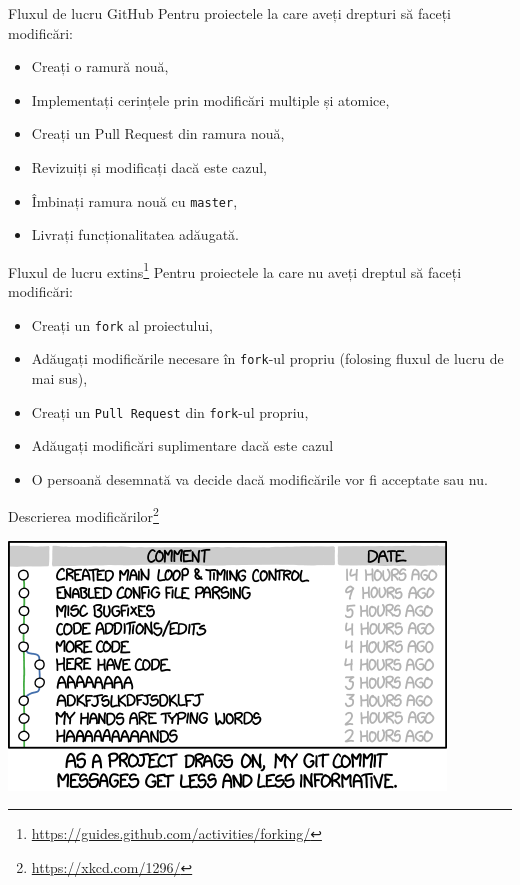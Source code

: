 \documentclass[presentation]{beamer}
\begin{document}
\begin{frame}[label={sec:orgafaea58},fragile]{Fluxul de lucru GitHub}
 Pentru proiectele la care aveți drepturi să faceți modificări:
\begin{itemize}
\item Creați o ramură nouă,
\item Implementați cerințele prin \alert{modificări multiple și atomice},
\item Creați un \alert{Pull Request} din ramura nouă,
\item Revizuiți și modificați dacă este cazul,
\item Îmbinați ramura nouă cu \texttt{master},
\item Livrați funcționalitatea adăugată.
\end{itemize}
\end{frame}
\begin{frame}[label={sec:org06f68ce},fragile]{Fluxul de lucru extins\footnote{\url{https://guides.github.com/activities/forking/}}}
 Pentru proiectele la care nu aveți dreptul să faceți modificări:
\begin{itemize}
\item Creați un \texttt{fork} al proiectului,
\item Adăugați modificările necesare în \texttt{fork}-ul propriu (folosing fluxul de lucru de mai sus),
\item Creați un \texttt{Pull Request} din \texttt{fork}-ul propriu,
\item Adăugați modificări suplimentare dacă este cazul
\item O persoană desemnată va decide dacă modificările vor fi acceptate sau nu.
\end{itemize}
\end{frame}
\begin{frame}[label={sec:org06d006c}]{Descrierea modificărilor\footnote{\url{https://xkcd.com/1296/}}}
\begin{center}
\includegraphics[width=.7\textwidth]{img/xkcd-git-commit.png}
\end{center}
\end{frame}
\end{document}
